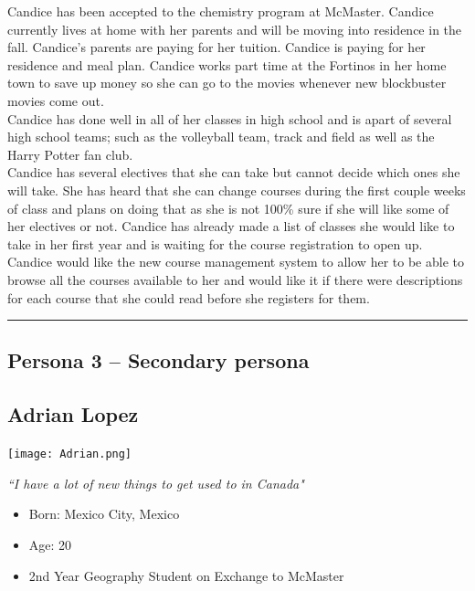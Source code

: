 \documentclass[12pt]{article}
\begin{document}
Candice has been accepted to the chemistry program at McMaster. Candice currently lives at home with her parents and will be moving into residence in the fall. Candice's parents are paying for her tuition. Candice is paying for her residence and meal plan. Candice works part time at the Fortinos in her home town to save up money so she can go to the movies whenever new blockbuster movies come out.\\

Candice has done well in all of her classes in high school and is apart of several high school teams; such as the volleyball team, track and field as well as the Harry Potter fan club.\\

Candice has several electives that she can take but cannot decide which ones she will take. She has heard that she can change courses during the first couple weeks of class and plans on doing that as she is not 100\% sure if she will like some of her electives or not. Candice has already made a list of classes she would like to take in her first year and is waiting for the course registration to open up. Candice would like the new course management system to allow her to be able to browse all the courses available to her and would like it if there were descriptions for each course that she could read before she registers for them.

\newpage
\hrule
\vspace{2mm}
\subsection{Persona 3 -- Secondary persona}
\vspace{11mm}

\subsection*{Adrian Lopez}
\vspace{4mm}

\begin{minipage}{70mm}
\texttt{[image: Adrian.png]}
\begin{center}
\emph{``I have a lot of new things to get used to in Canada"}
\end{center}
\end{minipage}\hfill
\begin{minipage}{\textwidth}
\begin{itemize}
\item Born: Mexico City, Mexico
\item Age: 20
\item 2nd Year Geography Student on Exchange to McMaster
\end{itemize}
\end{minipage}\\\\\\
\end{document}
